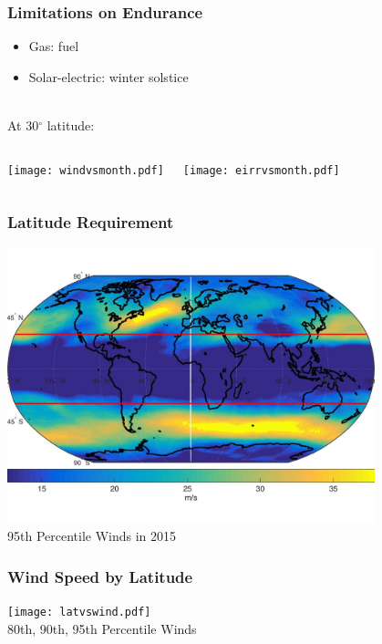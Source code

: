 \documentclass{beamer}
\begin{document}
\begin{frame}
    \frametitle{Limitations on Endurance}

    \begin{itemize}
        \item Gas: fuel 
        \item Solar-electric: winter solstice \\~\\
    \end{itemize}

    
    At 30$^{\circ}$ latitude:
    \begin{columns}
        \texttt{[image: windvsmonth.pdf]}
        
        \texttt{[image: eirrvsmonth.pdf]}
    \end{columns}

\end{frame}

\begin{frame}
    \frametitle{Latitude Requirement}

    \begin{center}
        \includegraphics[width=0.8\textwidth]{worldwinds.jpg} \\
        95th Percentile Winds in 2015
    \end{center}

\end{frame}

\begin{frame}
    \frametitle{Wind Speed by Latitude}

    \begin{center}
    \texttt{[image: latvswind.pdf]} \\
    80th, 90th, 95th Percentile Winds
    \end{center}

\end{frame}
\end{document}
